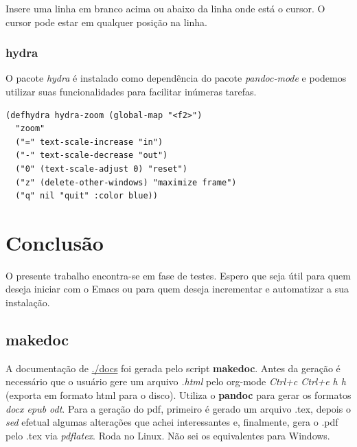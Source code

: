 \documentclass[]{article}
\begin{document}
Insere uma linha em branco acima ou abaixo da linha onde está o cursor.
O cursor pode estar em qualquer posição na linha.

\subsubsection{hydra}\label{hydra}

O pacote \emph{hydra} é instalado como dependência do pacote
\emph{pandoc-mode} e podemos utilizar suas funcionalidades para
facilitar inúmeras tarefas.

\begin{verbatim}
(defhydra hydra-zoom (global-map "<f2>")
  "zoom"
  ("=" text-scale-increase "in")
  ("-" text-scale-decrease "out")
  ("0" (text-scale-adjust 0) "reset")
  ("z" (delete-other-windows) "maximize frame")
  ("q" nil "quit" :color blue))
\end{verbatim}

\section{Conclusão}\label{conclusuxe3o}

O presente trabalho encontra-se em fase de testes. Espero que seja útil
para quem deseja iniciar com o Emacs ou para quem deseja incrementar e
automatizar a sua instalação.

\subsection{makedoc}\label{makedoc}

A documentação de \url{./docs} foi gerada pelo script \textbf{makedoc}.
Antes da geração é necessário que o usuário gere um arquivo \emph{.html}
pelo org-mode \emph{Ctrl+c Ctrl+e h h} (exporta em formato html para o
disco). Utiliza o \textbf{pandoc} para gerar os formatos \emph{docx epub
odt}. Para a geração do pdf, primeiro é gerado um arquivo .tex, depois o
\emph{sed} efetual algumas alterações que achei interessantes e,
finalmente, gera o .pdf pelo .tex via \emph{pdflatex}. Roda no Linux.
Não sei os equivalentes para Windows.
\end{document}
